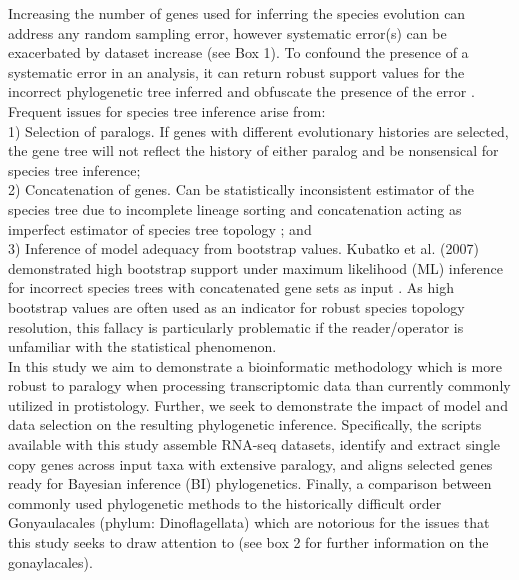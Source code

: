 \documentclass[12pt]{article}
\begin{document}
Increasing the number of genes used for inferring the species evolution can address any random sampling error, however systematic error(s) can be exacerbated by dataset increase (see Box 1). 
To confound the presence of a systematic error in an analysis, it can return robust support values for the incorrect phylogenetic tree inferred and obfuscate the presence of the error \cite{jeffroy2006phylogenomics,roch2015likelihood,kubatko2007inconsistency}. 
Frequent issues for species tree inference arise from:\\
1) Selection of paralogs. 
If genes with different evolutionary histories are selected, the gene tree will not reflect the history of either paralog and be nonsensical for species tree inference; \\
2) Concatenation of genes. 
Can be statistically inconsistent estimator of the species tree due to incomplete lineage sorting and concatenation acting as imperfect estimator of species tree topology \cite{roch2015likelihood}; and \\
3) Inference of model adequacy from bootstrap values. 
Kubatko et al. (2007) demonstrated high bootstrap support under maximum likelihood (ML) inference for incorrect species trees with concatenated gene sets as input \cite{kubatko2007inconsistency}. 
As high bootstrap values are often used as an indicator for robust species topology resolution, this fallacy is particularly problematic if the reader/operator is unfamiliar with the statistical phenomenon.\\
In this study we aim to demonstrate a bioinformatic methodology which is more robust to paralogy when processing transcriptomic data than currently commonly utilized in protistology. 
Further, we seek to demonstrate the impact of model and data selection on the resulting phylogenetic inference. 
Specifically, the scripts available with this study assemble RNA-seq datasets, identify and extract single copy genes across input taxa with extensive paralogy, and aligns selected genes ready for Bayesian inference (BI) phylogenetics. 
Finally, a comparison between commonly used phylogenetic methods to the historically difficult order Gonyaulacales (phylum: Dinoflagellata) which are notorious for the issues that this study seeks to draw attention to (see box 2 for further information on the gonaylacales).\\

\end{document}
